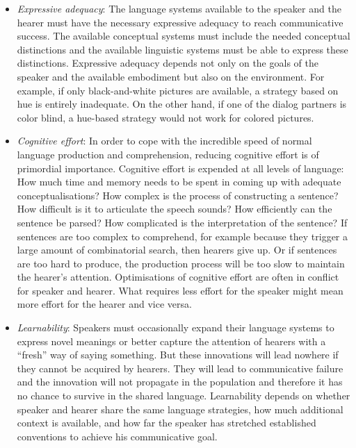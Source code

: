 \begin{itemize}
\item {\itshape Expressive adequacy}: The language systems available to the speaker and the hearer must have 
the necessary expressive adequacy to reach communicative success. 
The available conceptual systems must include the needed conceptual distinctions 
and the available linguistic systems must be able to express these distinctions. Expressive adequacy depends 
not only on the goals of the speaker and the available embodiment but also on the environment. For example, 
if only black-and-white pictures are available, a strategy based on hue is entirely inadequate. On the other hand, 
if one of the dialog partners is color blind, a hue-based strategy would not work for colored pictures. 

\item {\itshape Cognitive effort}: In order to cope with the incredible speed of normal language production and comprehension, 
reducing cognitive effort is of primordial importance. Cognitive effort is expended at all levels
of language: How much time and memory 
needs to be spent in coming up with adequate conceptualisations? How complex is the process of constructing
a sentence? How 
difficult is it to articulate the speech sounds? How efficiently can the sentence be parsed? How complicated is the 
interpretation of the sentence? If sentences are too 
complex to comprehend, for example because they trigger a large amount of combinatorial search, then 
hearers give up. Or if sentences 
are too hard to produce, the production process will be too slow to maintain the hearer's attention. 
Optimisations of cognitive effort are often in conflict for speaker and hearer. What requires less effort for the 
speaker might mean more effort for the hearer and vice versa. 

\item {\itshape Learnability}: Speakers must occasionally expand their language systems to express novel meanings or 
better capture the attention of hearers with a ``fresh'' way of saying something. But these innovations will 
lead nowhere if they cannot be acquired by hearers. They will lead to communicative failure and 
the innovation will not propagate in the population and therefore it has no chance to survive in the shared language.
Learnability depends on whether speaker and hearer share the same language strategies, how much additional context 
is available, and how far the speaker has stretched established conventions to achieve his communicative goal. 


\end{itemize}
